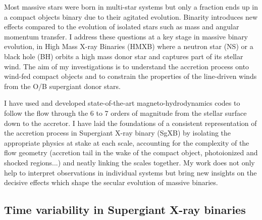 \documentclass[letterpaper,12pt,onecolumn]{article}
\makeatletter
\newcommand{\sgx}{SgXB\xspace}
\newcommand*{\hmxb}{HMXB\@\xspace}
\newcommand*{\ns}{NS\@\xspace}
\newcommand*{\bh}{BH\@\xspace}
\makeatother
\begin{document}
Most massive stars were born in multi-star systems but only a fraction ends up in a compact objects binary due to their agitated evolution. Binarity introduces new effects compared to the evolution of isolated stars such as mass and angular momentum transfer. I address these questions at a key stage in massive binary evolution, in High Mass X-ray Binaries (\hmxb) where a neutron star (\ns) or a black hole (\bh) orbits a high mass donor star and captures part of its stellar wind. The aim of my investigations is to understand the accretion process onto wind-fed compact objects and to constrain the properties of the line-driven winds from the O/B supergiant donor stars.

I have used and developed state-of-the-art magneto-hydrodynamics codes to follow the flow through the 6 to 7 orders of magnitude from the stellar surface down to the accretor. I have laid the foundations of a consistent representation of the accretion process in Supergiant X-ray binary (\sgx) by isolating the appropriate physics at stake at each scale, accounting for the complexity of the flow geometry (accretion tail in the wake of the compact object, photoionized and shocked regions...) and neatly linking the scales together. My work does not only help to interpret observations in individual systems but bring new insights on the decisive effects which shape the secular evolution of massive binaries.


\subsection*{Time variability in Supergiant X-ray binaries}

\end{document}
